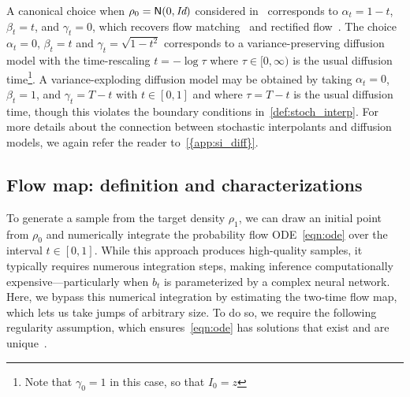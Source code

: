 A canonical choice when $\rho_0 = \mathsf{N}(0, \text{\it Id})$ considered in~\citet{albergo2022building} corresponds to $\alpha_t = 1-t$, $\beta_t = t$, and $\gamma_t = 0$, which recovers flow matching~\citep{lipman2022flow} and rectified flow~\citep{liu2022flow}.
%
The choice $\alpha_t = 0$, $\beta_t = t$ and $\gamma_t = \sqrt{1-t^2}$ corresponds to a variance-preserving diffusion model with the time-rescaling $t = -\log\tau$ where $\tau \in [0, \infty)$ is the usual diffusion time\footnote{Note that $\gamma_0=1$ in this case, so that $I_0=z$}.
A variance-exploding diffusion model may be obtained by taking $\alpha_t = 0$, $\beta_t = 1$, and $\gamma_t = T-t$ with $t \in [0, 1]$ and where $\tau = T-t$ is the usual diffusion time, though this violates the boundary conditions in~\cref{def:stoch_interp}. For more details about the connection between stochastic interpolants and diffusion models, we again refer the reader to~\cref{{app:si_diff}}.


\subsection{Flow map: definition and characterizations}
\label{ssec:setup}
%
To generate a sample from the target density $\rho_1$, we can draw an initial point from $\rho_0$ and numerically integrate the probability flow ODE~\eqref{eqn:ode} over the interval $t\in[0,1]$.
%
While this approach produces high-quality samples, it typically requires numerous integration steps, making inference computationally expensive---particularly when $b_t$ is parameterized by a complex neural network.
%
Here, we bypass this numerical integration by estimating the two-time flow map, which lets us take jumps of arbitrary size.
%
To do so, we require the following regularity assumption, which ensures~\eqref{eqn:ode} has solutions that exist and are unique~\citep{hartman2002ordinary}.

